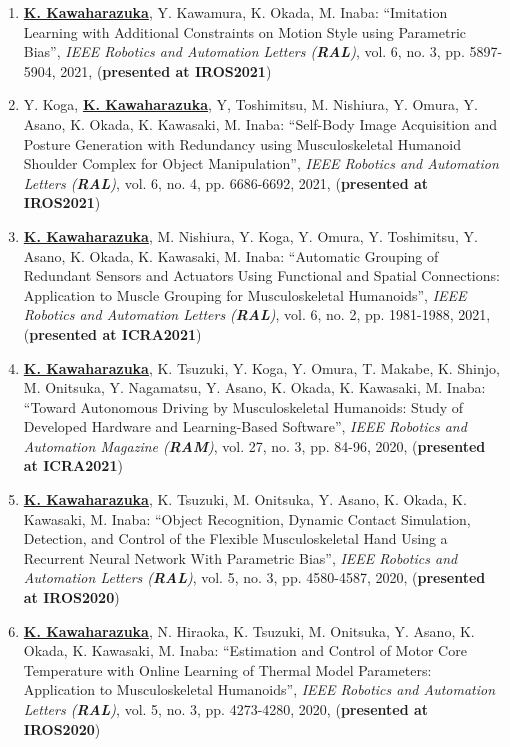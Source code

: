 \documentclass[letterpaper]{article}
\begin{document}
\begin{enumerate}
\item \underline{\textbf{K. Kawaharazuka}}, Y. Kawamura, K. Okada, M. Inaba: ``Imitation Learning with Additional Constraints on Motion Style using Parametric Bias'', \textit{IEEE Robotics and Automation Letters (\textit{\textbf{RAL}})}, vol. 6, no. 3, pp. 5897-5904, 2021, (\textbf{presented at IROS2021})
\item Y. Koga, \underline{\textbf{K. Kawaharazuka}}, Y, Toshimitsu, M. Nishiura, Y. Omura, Y. Asano, K. Okada, K. Kawasaki, M. Inaba: ``Self-Body Image Acquisition and Posture Generation with Redundancy using Musculoskeletal Humanoid Shoulder Complex for Object Manipulation'', \textit{IEEE Robotics and Automation Letters (\textit{\textbf{RAL}})}, vol. 6, no. 4, pp. 6686-6692, 2021, (\textbf{presented at IROS2021})
\item \underline{\textbf{K. Kawaharazuka}}, M. Nishiura, Y. Koga, Y. Omura, Y. Toshimitsu, Y. Asano, K. Okada, K. Kawasaki, M. Inaba: ``Automatic Grouping of Redundant Sensors and Actuators Using Functional and Spatial Connections: Application to Muscle Grouping for Musculoskeletal Humanoids'', \textit{IEEE Robotics and Automation Letters (\textit{\textbf{RAL}})}, vol. 6, no. 2, pp. 1981-1988, 2021, (\textbf{presented at ICRA2021})
\item \underline{\textbf{K. Kawaharazuka}}, K. Tsuzuki, Y. Koga, Y. Omura, T. Makabe, K. Shinjo, M. Onitsuka, Y. Nagamatsu, Y. Asano, K. Okada, K. Kawasaki, M. Inaba: ``Toward Autonomous Driving by Musculoskeletal Humanoids: Study of Developed Hardware and Learning-Based Software'', \textit{IEEE Robotics and Automation Magazine (\textit{\textbf{RAM}})}, vol. 27, no. 3, pp. 84-96, 2020, (\textbf{presented at ICRA2021})
\item \underline{\textbf{K. Kawaharazuka}}, K. Tsuzuki, M. Onitsuka, Y. Asano, K. Okada, K. Kawasaki, M. Inaba: ``Object Recognition, Dynamic Contact Simulation, Detection, and Control of the Flexible Musculoskeletal Hand Using a Recurrent Neural Network With Parametric Bias'', \textit{IEEE Robotics and Automation Letters (\textit{\textbf{RAL}})}, vol. 5, no. 3, pp. 4580-4587, 2020, (\textbf{presented at IROS2020})
\item \underline{\textbf{K. Kawaharazuka}}, N. Hiraoka, K. Tsuzuki, M. Onitsuka, Y. Asano, K. Okada, K. Kawasaki, M. Inaba: ``Estimation and Control of Motor Core Temperature with Online Learning of Thermal Model Parameters: Application to Musculoskeletal Humanoids'', \textit{IEEE Robotics and Automation Letters (\textit{\textbf{RAL}})}, vol. 5, no. 3, pp. 4273-4280, 2020, (\textbf{presented at IROS2020})

\end{enumerate}
\end{document}
